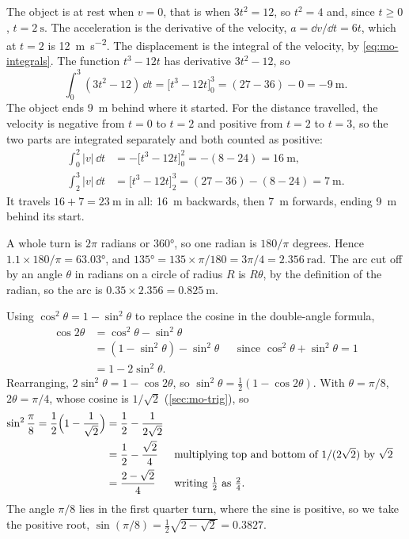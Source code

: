 The object is at rest when $v = 0$, that is
when $3t^2 = 12$, so $t^2 = 4$ and, since $t \ge 0$, $t =
\SI{2}{\second}$. The acceleration is the derivative of the velocity, $a =
\dd v/\dd t = 6t$, which at $t = 2$ is \SI{12}{\metre\per\second\squared}.
The displacement is the integral of the velocity, by
\cref{eq:mo-integrals}. The function $t^3 - 12t$ has derivative $3t^2 -
12$, so
\begin{equation*}
   \int_0^3 (3t^2 - 12)\,\dd t = \bigl[t^3 - 12t\bigr]_0^3
   = (27 - 36) - 0 = \SI{-9}{\metre} .
\end{equation*}
The object ends \SI{9}{\metre} behind where it started. For the distance
travelled, the velocity is negative from $t = 0$ to $t = 2$ and positive
from $t = 2$ to $t = 3$, so the two parts are integrated separately and
both counted as positive:
\begin{align*}
   \int_0^2 \lvert v\rvert\,\dd t &= -\bigl[t^3 - 12t\bigr]_0^2
      = -(8 - 24) = \SI{16}{\metre} ,\\
   \int_2^3 \lvert v\rvert\,\dd t &= \bigl[t^3 - 12t\bigr]_2^3
      = (27 - 36) - (8 - 24) = \SI{7}{\metre} .
\end{align*}
It travels $16 + 7 = \SI{23}{\metre}$ in all: \SI{16}{\metre} backwards,
then \SI{7}{\metre} forwards, ending \SI{9}{\metre} behind its start.

A whole turn is $2\pi$ radians or \ang{360}, so
one radian is $180/\pi$ degrees. Hence $1.1 \times 180/\pi = \ang{63.03}$,
and $\ang{135} = 135\times\pi/180 = 3\pi/4 = \SI{2.356}{\radian}$. The arc
cut off by an angle $\theta$ in radians on a circle of radius $R$ is
$R\theta$, by the definition of the radian, so the arc is $0.35 \times
2.356 = \SI{0.825}{\metre}$.

Using $\cos^2\theta = 1 - \sin^2\theta$ to
replace the cosine in the double-angle formula,
\begin{align*}
   \cos 2\theta &= \cos^2\theta - \sin^2\theta\\
   &= (1 - \sin^2\theta) - \sin^2\theta
      && \text{since $\cos^2\theta + \sin^2\theta = 1$}\\
   &= 1 - 2\sin^2\theta .
\end{align*}
Rearranging, $2\sin^2\theta = 1 - \cos 2\theta$, so $\sin^2\theta =
\tfrac12(1 - \cos 2\theta)$. With $\theta = \pi/8$, $2\theta = \pi/4$,
whose cosine is $1/\sqrt2$ (\cref{sec:mo-trig}), so
\begin{align*}
   \sin^2\frac{\pi}{8} = \frac12\Bigl(1 - \frac{1}{\sqrt2}\Bigr)
   &= \frac12 - \frac{1}{2\sqrt2}\\
   &= \frac12 - \frac{\sqrt2}{4}
      && \text{multiplying top and bottom of $1/(2\sqrt2)$ by $\sqrt2$}\\
   &= \frac{2 - \sqrt2}{4}
      && \text{writing $\tfrac12$ as $\tfrac24$.}
\end{align*}
The angle $\pi/8$ lies in the first quarter turn, where the sine is
positive, so we take the positive root, $\sin(\pi/8) = \tfrac12\sqrt{2 -
\sqrt2} = 0.3827$.

